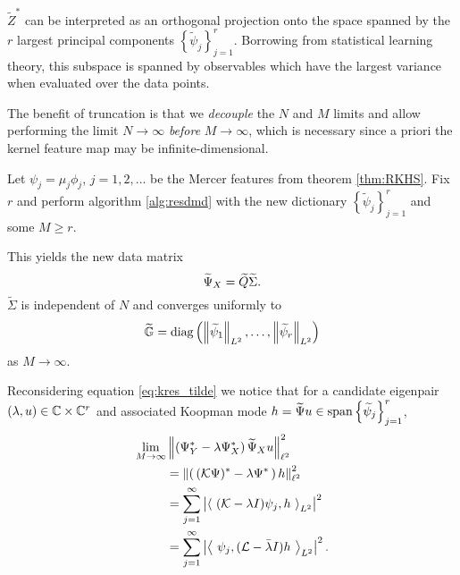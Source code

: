 $\widetilde{ Z }^*$ can be interpreted as an orthogonal projection onto the space spanned 
by the $r$ largest principal components $\left\{ \widetilde{ \psi }_j \right\}_{j=1}^r$. 
Borrowing from statistical learning theory, this subspace is spanned by observables which 
have the largest variance when evaluated over the data points. 

The benefit of truncation is that we \emph{decouple} the $N$ and $M$ limits and allow 
performing the limit $N \to \infty$ \emph{before} $M \to \infty$, which is necessary since 
a priori the kernel feature map may be infinite-dimensional. 

Let $\psi_j = \mu_j \phi_j$, $j = 1, 2, \ldots$ be the Mercer features from theorem 
\ref{thm:RKHS}. Fix $r$ and perform algorithm \ref{alg:resdmd} with the new dictionary 
$\left\{ \widetilde{ \psi }_j \right\}_{j=1}^r$ and some $M \geq r$. 

This yields the new data matrix 
\begin{equation}
    \widetilde{\Psi}_X = \widetilde{ Q } \widetilde{ \Sigma } . 
\end{equation}
$\widetilde{ \Sigma }$ is independent of $N$ and converges uniformly to 
\begin{equation}
    \label{eq:G_tilde}
    \widetilde{ \mathbb{G} } = \text{diag} \left( 
        \left\| \widetilde{ \psi }_1 \right\|_{L^2},
        \ldots, \left\| \widetilde{ \psi }_r \right\|_{L^2} 
    \right)
\end{equation}
as $M \to \infty$. 

Reconsidering equation \ref{eq:kres_tilde} we notice that for a candidate eigenpair 
$(\lambda, u) \in \mathbb{C} \times \mathbb{C}^r$ and associated Koopman mode 
$h = \widetilde{\Psi} u \in \text{span} \left\{ \widetilde{ \psi }_j \right\}_{j=1}^r$, 
\begin{equation}
    \begin{split}
        \lim_{M \to \infty} &\left\| \left( \Psi_Y^* - \lambda \Psi_X^* \right) \widetilde{\Psi}_X u \right\|_{\ell^2}^2 \\
        &= \left\| \left(\, (\mathcal{K} \Psi)^* - \lambda \Psi^* \,\right) h \right\|_{\ell^2}^2 \\
        &= \sum_{j=1}^{\infty} \left| \left\langle\ (\mathcal{K} - \lambda I) \psi_j, h \ \right\rangle_{L^2} \right|^2 \\
        &= \sum_{j=1}^{\infty} \left| \left\langle\ \psi_j, (\mathcal{L} - \bar{\lambda} I) h \ \right\rangle_{L^2} \right|^2 . 
    \end{split}
\end{equation}

